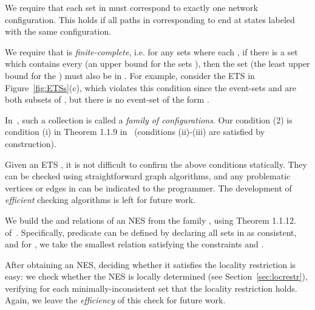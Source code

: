 \documentclass[pldi-cameraready]{sigplanconf}
\newcommand*\xmnote[3][0pt]{}
\begin{document}
\begin{compactenum}
\item We require that each set  in  must correspond to
  exactly one network configuration. This holds if all paths in
   corresponding to  end at states labeled with the same
  configuration.

\item We require that  is {\em finite-complete}, i.e. for any
  sets  where each , if there is a set
   which contains
  every  (an upper bound for the sets ), then the set  (the least upper
  bound for the ) must also be in .  For example, consider the
  ETS in Figure~\ref{fig:ETSs}(c), which violates this condition since
  the event-sets  and  are both subsets of
  , but there is no event-set of the form .
\end{compactenum}

\noindent In~\cite{winskel1987event}, such a collection  is
called a {\em family of configurations}. Our condition (2) is
condition (i) in Theorem 1.1.9 in~\cite{winskel1987event} (conditions
(ii)-(iii) are satisfied by construction).

Given an ETS , it is not difficult to confirm the above conditions
\xmnote{\FiveStar}{Q8}statically.
They can be checked using
straightforward graph algorithms, and any problematic vertices or
edges in  can be indicated to the programmer.
The development of {\em efficient} checking algorithms is left
for future work.

We build the  and  relations of an NES from
the family , using Theorem
1.1.12. of~\cite{winskel1987event}. Specifically, predicate  can be defined by
declaring all sets in  as consistent, and for , we take the
smallest relation satisfying the constraints  and .



After obtaining an NES, deciding whether it satisfies the locality
restriction is easy: we check whether the NES is locally determined
(see Section~\ref{sec:locrestr}), verifying for each
minimally-inconsistent set that the locality restriction holds.
Again, we leave the {\em efficiency} of this check for future work.
\end{document}
